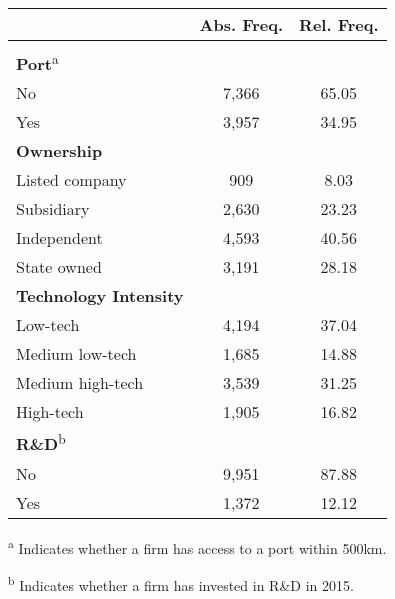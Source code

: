 \begin{threeparttable}

\begin{tabular}{lcc} \toprule \toprule 
			& Abs. Freq.	& Rel. Freq. \\
	\midrule 							\\[-1.8ex]
\textbf{Port}\textsuperscript{a} & & 						\\
No				& 7,366		& 65.05		\\
Yes				& 3,957     & 34.95		\\[1.2ex]
\textbf{Ownership}	& &					\\
Listed company	& 909 		& 8.03 		\\
Subsidiary		& 2,630 	& 23.23 	\\
Independent 	&  4,593 	& 40.56 	\\
State owned		& 3,191     & 28.18		\\[1.2ex]
\textbf{Technology Intensity}	& &		\\
Low-tech		& 4,194		& 37.04 	\\
Medium low-tech	& 1,685		& 14.88 	\\
Medium high-tech & 3,539	& 31.25 	\\
High-tech  		& 1,905		& 16.82 	\\[1.2ex]
\textbf{R\&D}\textsuperscript{b}	& &						\\
No				&  9,951	& 87.88		\\
Yes				& 1,372		& 12.12 	\\[1.2ex]
	\hline \hline
\end{tabular}

\begin{tablenotes}[flushleft]
\footnotesize
\item \textsuperscript{a} Indicates whether a firm has access to a port within 500km.
\item \textsuperscript{b} Indicates whether a firm has invested in R\&D in 2015.
\end{tablenotes}

\end{threeparttable}